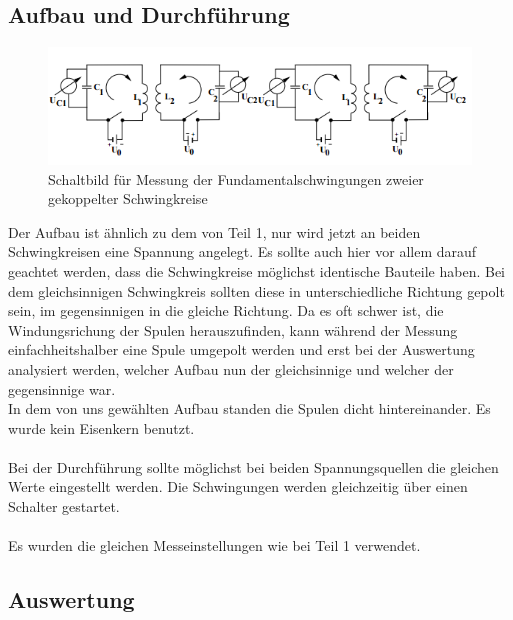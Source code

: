 \documentclass[12pt,a4paper]{article}
\begin{document}
\subsection{Aufbau und Durchführung}

\begin{figure}
\begin{center}
\includegraphics[width=\linewidth]{Bilder/Fund_Aufbau.PNG}
\end{center}
\caption[Aufbau Schwebung]{Schaltbild für Messung der Fundamentalschwingungen zweier gekoppelter Schwingkreise}
\label{fig:Fund_Aufbau}
\end{figure}

Der Aufbau ist ähnlich zu dem von Teil 1, nur wird jetzt an beiden Schwingkreisen eine Spannung angelegt. Es sollte auch hier vor allem darauf geachtet werden, dass die Schwingkreise möglichst identische Bauteile haben.
Bei dem gleichsinnigen Schwingkreis sollten diese in unterschiedliche Richtung gepolt sein, im gegensinnigen in die gleiche Richtung. Da es oft schwer ist, die Windungsrichung der Spulen herauszufinden, kann während der Messung einfachheitshalber eine Spule umgepolt werden und erst bei der Auswertung analysiert werden, welcher Aufbau nun der gleichsinnige und welcher der gegensinnige war.\\
In dem von uns gewählten Aufbau standen die Spulen dicht hintereinander. Es wurde kein Eisenkern benutzt.\\
\\
Bei der Durchführung sollte möglichst bei beiden Spannungsquellen die gleichen Werte eingestellt werden. Die Schwingungen werden gleichzeitig über einen Schalter gestartet.\\
\\
Es wurden die gleichen Messeinstellungen wie bei Teil 1 verwendet.

\subsection{Auswertung}
\end{document}
